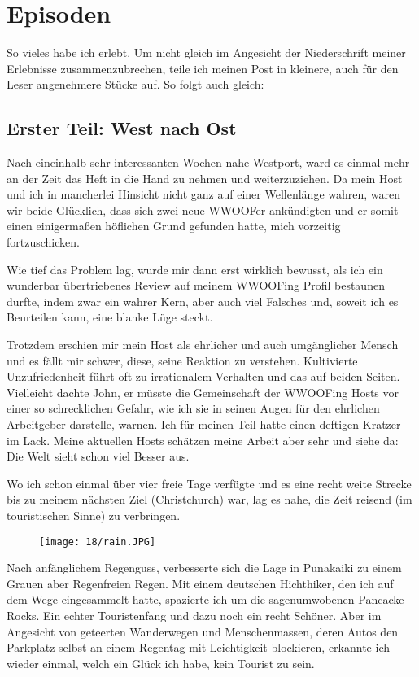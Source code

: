 \chapter{Episoden}

So vieles habe ich erlebt. Um nicht gleich im Angesicht der
Niederschrift meiner Erlebnisse zusammenzubrechen, teile ich meinen Post
in kleinere, auch für den Leser angenehmere Stücke auf. So folgt auch
gleich:

\section*{Erster Teil: West nach Ost}
Nach eineinhalb sehr interessanten Wochen nahe Westport, ward es
einmal mehr an der Zeit das Heft in die Hand zu nehmen und
weiterzuziehen. Da mein Host und ich in mancherlei Hinsicht nicht ganz
auf einer Wellenlänge wahren, waren wir beide Glücklich, dass sich
zwei neue WWOOFer ankündigten und er somit einen einigermaßen
höflichen Grund gefunden hatte, mich vorzeitig fortzuschicken.

Wie tief das Problem lag, wurde mir dann erst wirklich bewusst, als
ich ein wunderbar übertriebenes Review auf meinem WWOOFing Profil
bestaunen durfte, indem zwar ein wahrer Kern, aber auch viel Falsches
und, soweit ich es Beurteilen kann, eine blanke Lüge steckt.

Trotzdem erschien mir mein Host als ehrlicher und auch umgänglicher
Mensch und es fällt mir schwer, diese, seine Reaktion zu
verstehen. Kultivierte Unzufriedenheit führt oft zu irrationalem
Verhalten und das auf beiden Seiten. Vielleicht dachte John, er müsste
die Gemeinschaft der WWOOFing Hosts vor einer so schrecklichen Gefahr,
wie ich sie in seinen Augen für den ehrlichen Arbeitgeber darstelle,
warnen. Ich für meinen Teil hatte einen deftigen Kratzer im
Lack. Meine aktuellen Hosts schätzen meine Arbeit aber sehr und siehe
da: Die Welt sieht schon viel Besser aus.

Wo ich schon einmal über vier freie Tage verfügte und es eine recht
weite Strecke bis zu meinem nächsten Ziel (Christchurch) war, lag es
nahe, die Zeit reisend (im touristischen Sinne) zu verbringen.

\begin{figure}[h]
  \centering
  \texttt{[image: 18/rain.JPG]}
\end{figure}
Nach anfänglichem Regenguss, verbesserte sich die Lage in Punakaiki zu
einem Grauen aber Regenfreien Regen. Mit einem deutschen Hichthiker,
den ich auf dem Wege eingesammelt hatte, spazierte ich um die
sagenumwobenen Pancacke Rocks. Ein echter Touristenfang und dazu noch
ein recht Schöner. Aber im Angesicht von geteerten Wanderwegen und
Menschenmassen, deren Autos den Parkplatz selbst an einem Regentag mit
Leichtigkeit blockieren, erkannte ich wieder einmal, welch ein Glück
ich habe, kein Tourist zu sein.

